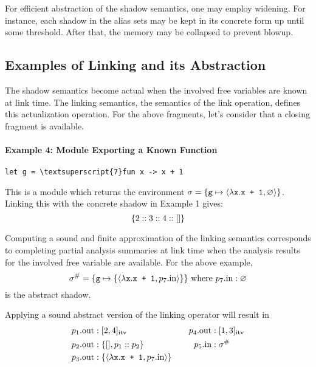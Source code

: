 \documentclass{article}
\begin{document}
For efficient abstraction of the shadow semantics, one may employ widening.
For instance, each shadow in the alias sets may be kept in its concrete form
up until some threshold. After that, the memory may be collapsed to prevent blowup.

\subsection{Examples of Linking and its Abstraction}
The shadow semantics become actual when the involved free variables
are known at link time. The linking semantics, the semantics of the link
operation, defines this actualization operation. For the above fragments, let's
consider that a closing fragment is available.

\paragraph{Example 4: Module Exporting a Known Function}
\begin{center}
  \begin{BVerbatim}[commandchars=\\\{\}]
let g = \textsuperscript{7}fun x -> x + 1
  \end{BVerbatim}
\end{center}
This is a module which returns the environment
$\sigma=\{\texttt{g}\mapsto\langle\lambda\texttt{x}.\texttt{x + 1},\varnothing\rangle\}$.
Linking this with the concrete shadow in Example 1 gives:
\[\{2::3::4::[]\}\]

Computing a sound and finite approximation of the linking semantics
corresponds to completing partial analysis summaries at link time when
the analysis results for the involved free variable are available. For
the above example,
\[
  {\sigma}^{\#}=\{\texttt{g}\mapsto\{\langle\lambda\texttt{x}.\texttt{x + 1},p_7.\text{in}\rangle\}\}\text{ where }
  p_7.\text{in}:\varnothing
\]
is the abstract shadow.

Applying a sound abstract version of the linking operator will result in
\begin{align*}
  p_1.\text{out} & :[2,4]_{\text{itv}}                                                     &  &  & p_4.\text{out} & :[1,3]_{\text{itv}} \\
  p_2.\text{out} & :\{[],p_1:: p_2\}                                        &  &  & p_5.\text{in}  & :{\sigma}^{\#}           \\
  p_3.\text{out} & :\{\langle\lambda\texttt{x}.\texttt{x + 1},p_7.\text{in}\rangle\} &  &  &
\end{align*}
\end{document}
